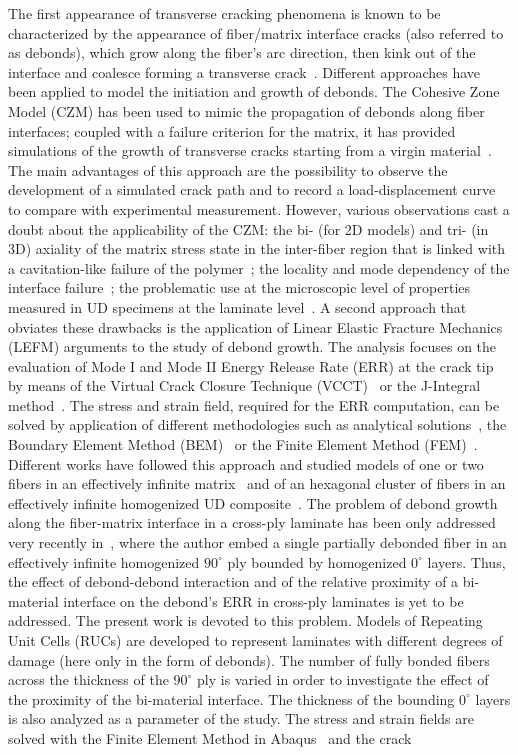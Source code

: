 \documentclass[review]{elsarticle}
\begin{document}
The first appearance of transverse cracking phenomena is known to be characterized by the appearance of fiber/matrix interface cracks (also referred to as debonds), which grow along the fiber's arc direction, then kink out of the interface and coalesce forming a transverse crack~\cite{Bailey1981}. Different approaches have been applied to model the initiation and growth of debonds. The Cohesive Zone Model (CZM) has been used to mimic the propagation of debonds along fiber interfaces; coupled with a failure criterion for the matrix, it has provided simulations of the growth of transverse cracks starting from a virgin material~\cite{Kushch2011,Canal2012,Bouhala2013,Herraez2015}. The main advantages of this approach are the possibility to observe the development of a simulated crack path and to record a load-displacement curve to compare with experimental measurement. However, various observations cast a doubt about the applicability of the CZM: the bi- (for 2D models) and tri- (in 3D) axiality of the matrix stress state in the inter-fiber region that is linked with a cavitation-like failure of the polymer~\cite{Asp1995}; the locality and mode dependency of the interface failure~\cite{Mantic2009}; the problematic use at the microscopic level of properties measured in UD specimens at the laminate level~\cite{Canal2012}. A second approach that obviates these drawbacks is the application of Linear Elastic Fracture Mechanics (LEFM) arguments to the study of debond growth. The analysis focuses on the evaluation of Mode I and Mode II Energy Release Rate (ERR) at the crack tip by means of the Virtual Crack Closure Technique (VCCT)~\cite{Krueger2004} or the J-Integral method~\cite{Rice1968}. The stress and strain field, required for the ERR computation, can be solved by application of different methodologies such as analytical solutions~\cite{Toya1974}, the Boundary Element Method (BEM)~\cite{Paris1996} or the Finite Element Method (FEM)~\cite{Zhuang2018}. Different works have followed this approach and studied models of one or two fibers in an effectively infinite matrix~\cite{Correa2011,Correa2013,Correa2014,Sandino2016,Sandino2018} and of an hexagonal cluster of fibers in an effectively infinite homogenized UD composite~\cite{Varna2017,Zhuang2018}. The problem of debond growth along the fiber-matrix interface in a cross-ply laminate has been only addressed very recently in~\cite{Velasco2018,Paris2018}, where the author embed a single partially debonded fiber in an effectively infinite homogenized $90^{\circ}$ ply bounded by homogenized $0^{\circ}$ layers. Thus, the effect of debond-debond interaction and of the relative proximity of a bi-material interface on the debond's ERR in cross-ply laminates is yet to be addressed. The present work is devoted to this problem. Models of Repeating Unit Cells (RUCs) are developed to represent laminates with different degrees of damage (here only in the form of debonds). The number of fully bonded fibers across the thickness of the $90^{\circ}$ ply is varied in order to investigate the effect of the proximity of the bi-material interface. The thickness of the bounding $0^{\circ}$ layers is also analyzed as a parameter of the study. The stress and strain fields are solved with the Finite Element Method in Abaqus~\cite{abq12} and the crack 
\end{document}

